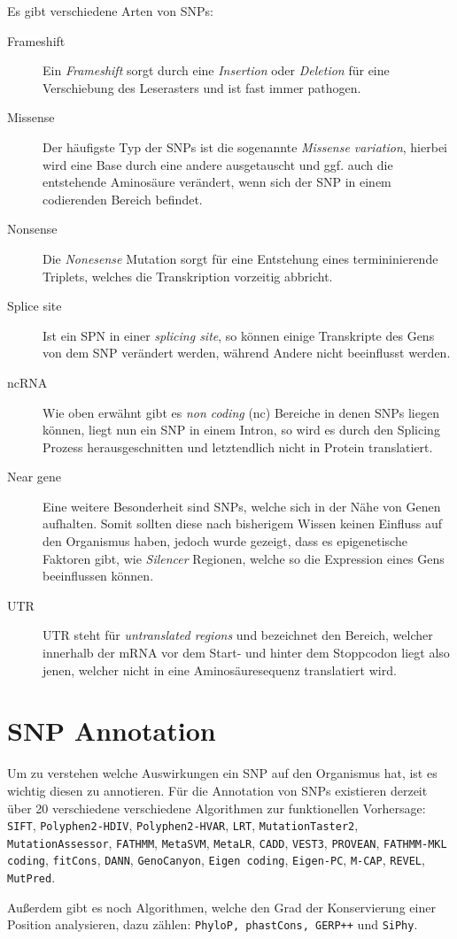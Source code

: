 Es gibt verschiedene Arten von \ac{SNP}s:

\begin{description}
\item[Frameshift]
Ein \emph{Frameshift} sorgt durch eine \emph{Insertion} oder \emph{Deletion} für eine Verschiebung des Leserasters und ist fast immer pathogen.
\item[Missense]
Der häufigste Typ der \ac{SNP}s ist die sogenannte \emph{Missense variation}, hierbei wird eine Base durch eine andere ausgetauscht und ggf. auch die entstehende Aminosäure verändert, wenn sich der \ac{SNP} in einem codierenden Bereich befindet. 
\item[Nonsense]
Die \emph{Nonesense} Mutation sorgt für eine Entstehung eines termininierende Triplets, welches die Transkription vorzeitig abbricht.
\item[Splice site]
Ist ein SPN in einer \emph{splicing site}, so können einige Transkripte des Gens von dem \ac{SNP} verändert werden, während Andere nicht beeinflusst werden.
\item[ncRNA]
Wie oben erwähnt gibt es \emph{non coding} (nc) Bereiche in denen \ac{SNP}s liegen können, liegt nun ein \ac{SNP} in einem Intron, so wird es durch den Splicing Prozess herausgeschnitten und letztendlich nicht in Protein translatiert. 
\item[Near gene]
Eine weitere Besonderheit sind SNPs, welche sich in der Nähe von Genen aufhalten. Somit sollten diese nach bisherigem Wissen keinen Einfluss auf den Organismus haben, jedoch wurde gezeigt, dass es epigenetische Faktoren gibt, wie \emph{Silencer} Regionen, welche so die Expression eines Gens beeinflussen können\cite{Maston.2006}. 
\item[UTR]
UTR steht für \emph{untranslated regions} und bezeichnet den Bereich, welcher innerhalb der mRNA vor dem Start- und hinter dem Stoppcodon liegt also jenen, welcher nicht in eine Aminosäuresequenz translatiert wird.
\end{description}



\section{SNP Annotation}
\begin{sloppypar}
Um zu verstehen welche Auswirkungen ein \ac{SNP} auf den Organismus hat, ist es wichtig diesen zu annotieren. 
Für die Annotation von \ac{SNP}s existieren derzeit über 20 verschiedene verschiedene Algorithmen zur funktionellen Vorhersage: \texttt{SIFT}, \texttt{Polyphen2-HDIV}, \texttt{Polyphen2-HVAR}, \texttt{LRT}, \texttt{MutationTaster2}, \texttt{MutationAssessor}, \texttt{FATHMM}, \texttt{MetaSVM}, \texttt{MetaLR}, \texttt{CADD}, \texttt{VEST3}, \texttt{PROVEAN}, \texttt{FATHMM-MKL coding}, \texttt{fitCons}, \texttt{DANN}, \texttt{GenoCanyon}, \texttt{Eigen coding}, \texttt{Eigen-PC}, \texttt{M-CAP}, \texttt{REVEL}, \texttt{MutPred}. 
\end{sloppypar}
Außerdem gibt es noch Algorithmen, welche den Grad der Konservierung einer Position analysieren, dazu zählen: \texttt{PhyloP, phastCons, GERP++} und \texttt{SiPhy}.

